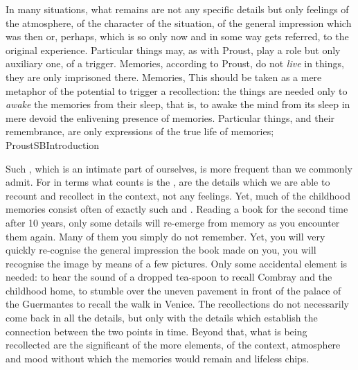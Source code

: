 In many situations, what remains are not any specific details but only
 feelings of the atmosphere, of the character of the situation, of the
general impression which was  then or, perhaps, which is so only now
and in some way gets referred,  to the original experience.
Particular things may, as with Proust, play a role but only auxiliary one, of a
trigger. Memories, according to Proust, do not {\em live} in things, they are
only imprisoned there. Memories,  This
 should be taken as a mere metaphor of the potential to
trigger a recollection: the  things are needed only to {\em awake}
the memories from their sleep, that is, to awake the mind from its sleep in mere
 devoid the enlivening presence of memories.  Particular things,
and their remembrance, are only expressions of the true life of memories;
 \citet{Compared to this past which is an intimate part of
  ourselves, the truths of intelligence seem little
  real.}{ProustSB}{Introduction} 

Such , which is an intimate part of ourselves, is more
frequent than we commonly admit. For in  terms what counts is the
, are the  details which we are able to
recount and recollect in the  context, not any  
 feelings.  Yet, much of the childhood memories consist often of exactly
such  and .  Reading a book for the second time after
10 years, only some details will re-emerge from memory as you encounter them
again.  Many of them you simply do not remember.  Yet, you will very quickly
re-cognise the general impression the book made on you, you will recognise the
image by means of a few pictures.  Only some accidental
 element is needed: to hear the sound of a dropped tea-spoon to
recall Combray and the childhood home, to stumble over the uneven pavement in
front of the palace of the Guermantes to recall the walk in Venice.
The recollections do not necessarily come back in all the details, but only with
the details which establish the connection between the two points in time.
Beyond that, what is being recollected are the significant  of the
more  elements, of the context, atmosphere and mood without which
the memories would remain  and lifeless chips.

